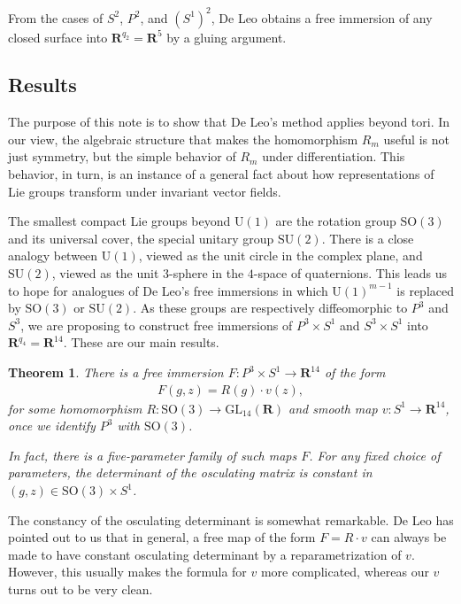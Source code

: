 \documentclass[a4paper,10pt,leqno]{article}
\numberwithin{equation}{section}
\theoremstyle{plain}
\newtheorem{thm}{Theorem}
\theoremstyle{definition}
\theoremstyle{remark}
\newcommand{\bb}{\mathbf}
\newcommand{\GL}{\mathrm{GL}}
\newcommand{\SU}{\mathrm{SU}}
\newcommand{\SO}{\mathrm{SO}}
\newcommand{\UL}{\mathrm{U}}
\begin{document}
From the cases of $S^2$, $P^2$, and $(S^1)^2$, De Leo obtains a free immersion of any closed surface into $\bb{R}^{q_2} = \bb{R}^5$ by a gluing argument. 

\subsection{Results}

The purpose of this note is to show that De Leo's method applies beyond tori.
In our view, the algebraic structure that makes the homomorphism $R_m$ useful is not just symmetry, but the simple behavior of $R_m$ under differentiation.
This behavior, in turn, is an instance of a general fact about how representations of Lie groups transform under invariant vector fields.

The smallest compact Lie groups beyond $\UL(1)$ are the rotation group $\SO(3)$ and its universal cover, the special unitary group $\SU(2)$.
There is a close analogy between $\UL(1)$, viewed as the unit circle in the complex plane, and $\SU(2)$, viewed as the unit $3$-sphere in the $4$-space of quaternions.
This leads us to hope for analogues of De Leo's free immersions in which $\UL(1)^{m - 1}$ is replaced by $\SO(3)$ or $\SU(2)$.
As these groups are respectively diffeomorphic to $P^3$ and $S^3$, we are proposing to construct free immersions of $P^3 \times S^1$ and $S^3 \times S^1$ into $\bb{R}^{q_4} = \bb{R}^{14}$.
These are our main results.

\begin{thm}\label{thm:main}
There is a free immersion $F \colon P^3 \times S^1 \to \bb{R}^{14}$ of the form
\begin{align}
F(g, z) = R(g) \cdot v(z),
\end{align}
for some homomorphism $R \colon \SO(3) \to \GL_{14}(\bb{R})$ and smooth map $v \colon S^1 \to \bb{R}^{14}$, once we identify $P^3$ with $\SO(3)$.

In fact, there is a five-parameter family of such maps $F$.
For any fixed choice of parameters, the determinant of the osculating matrix is constant in $(g, z) \in \SO(3) \times S^1$.
\end{thm}

The constancy of the osculating determinant is somewhat remarkable.
De Leo has pointed out to us that in general, a free map of the form $F = R \cdot v$ can always be made to have constant osculating determinant by a reparametrization of $v$.
However, this usually makes the formula for $v$ more complicated, whereas our $v$ turns out to be very clean.
\end{document}
